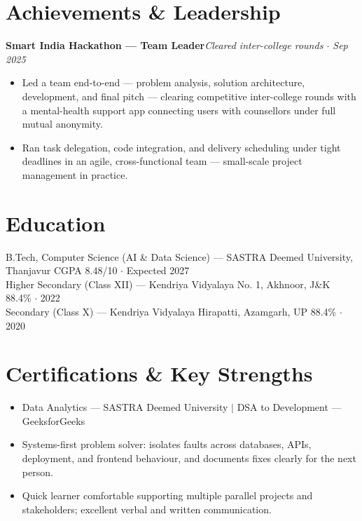 \documentclass[10pt,a4paper]{article}
\newcommand{\proj}[2]{\vspace{0.6mm}\noindent\textbf{#1}\hfill{\footnotesize\itshape #2}\par\vspace{-0.4mm}}
\begin{document}
\section{Achievements \& Leadership}
{\small
\proj{Smart India Hackathon --- Team Leader}{Cleared inter-college rounds $\cdot$ Sep 2025}
\begin{itemize}
\item Led a team end-to-end --- problem analysis, solution architecture, development, and final pitch --- clearing competitive inter-college rounds with a mental-health support app connecting users with counsellors under full mutual anonymity.
\item Ran task delegation, code integration, and delivery scheduling under tight deadlines in an agile, cross-functional team --- small-scale project management in practice.
\end{itemize}}

\section{Education}
{\small
\noindent B.Tech, Computer Science (AI \& Data Science) --- SASTRA Deemed University, Thanjavur \hfill CGPA 8.48/10 $\cdot$ Expected 2027\\
Higher Secondary (Class XII) --- Kendriya Vidyalaya No. 1, Akhnoor, J\&K \hfill 88.4\% $\cdot$ 2022\\
Secondary (Class X) --- Kendriya Vidyalaya Hirapatti, Azamgarh, UP \hfill 88.4\% $\cdot$ 2020}

\section{Certifications \& Key Strengths}
{\small
\begin{itemize}
\item Data Analytics --- SASTRA Deemed University \quad $\mid$ \quad DSA to Development --- GeeksforGeeks
\item Systems-first problem solver: isolates faults across databases, APIs, deployment, and frontend behaviour, and documents fixes clearly for the next person.
\item Quick learner comfortable supporting multiple parallel projects and stakeholders; excellent verbal and written communication.
\end{itemize}}
\end{document}
